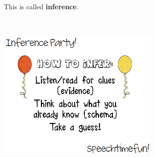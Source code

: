 \documentclass[12pt]{beamer} %
\begin{document}
\begin{slide}

This is called \textbf{inference}.\\
~\\
~\\


\begin{center}
\includegraphics[width=0.6\textwidth]{figures/uncert_fig_inference2.png}
\end{center}

\end{slide}






\end{document}
